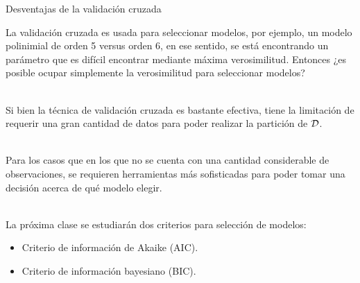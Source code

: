 \documentclass[9pt, handout]{beamer}
\begin{document}
\begin{frame}{Desventajas de la validación cruzada}

La validación cruzada es usada para seleccionar modelos, por ejemplo, un modelo polinimial de orden 5 versus orden 6, en ese sentido, se está encontrando un parámetro que es difícil encontrar mediante máxima verosimilitud. Entonces ¿es posible ocupar simplemente la verosimilitud para seleccionar modelos?\\~\

Si bien la técnica de validación cruzada es bastante efectiva, tiene la limitación de requerir una gran cantidad de datos para poder realizar la partición de ${\mathcal D}$.\\~\ 

Para los casos que en los que no se cuenta con una cantidad considerable de observaciones, se requieren herramientas más sofisticadas para poder tomar una decisión acerca de qué modelo elegir.\\~\ \pause

La próxima clase se estudiarán dos criterios para selección de modelos:

\begin{itemize}
	\item Criterio de información de Akaike (AIC).
	\item Criterio de información bayesiano (BIC).
\end{itemize}

	
\end{frame}
\end{document}
